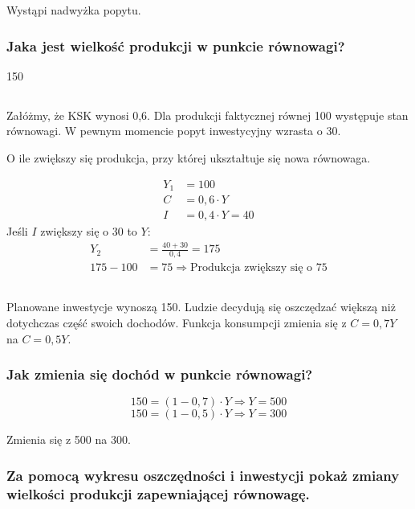 \documentclass[a4paper,12pt]{article}
\begin{document}
Wystąpi nadwyżka popytu.

\subsubsection{Jaka jest wielkość produkcji w punkcie równowagi?}

150

\subsection{}

Załóżmy, że KSK wynosi 0,6. Dla produkcji faktycznej równej 100 występuje stan równowagi. W pewnym momencie popyt inwestycyjny wzrasta o 30.

O ile zwiększy się produkcja, przy której ukształtuje się nowa równowaga.

\begin{align*}
	Y_1 & = 100              \\
	C   & = 0,6 \cdot Y      \\
	I   & = 0,4 \cdot Y = 40
\end{align*}
Jeśli $I$ zwiększy się o 30 to $Y$:
\begin{align*}
	Y_2       & = \frac{40 + 30}{0,4} = 175                         \\
	175 - 100 & = 75 \Rightarrow \text{Produkcja zwiększy się o 75}
\end{align*}

\subsection{}

Planowane inwestycje wynoszą 150. Ludzie decydują się oszczędzać większą niż dotychczas część swoich dochodów. Funkcja konsumpcji zmienia się z $C = 0,7Y$ na $C = 0,5Y$.

\subsubsection{Jak zmienia się dochód w punkcie równowagi?}

\[150 = \left(1 - 0,7\right)\cdot Y \Rightarrow Y = 500\]
\[150 = \left(1 - 0,5\right)\cdot Y \Rightarrow Y = 300\]

Zmienia się z 500 na 300.

\subsubsection{Za pomocą wykresu oszczędności i inwestycji pokaż zmiany wielkości produkcji zapewniającej równowagę.}
\end{document}
